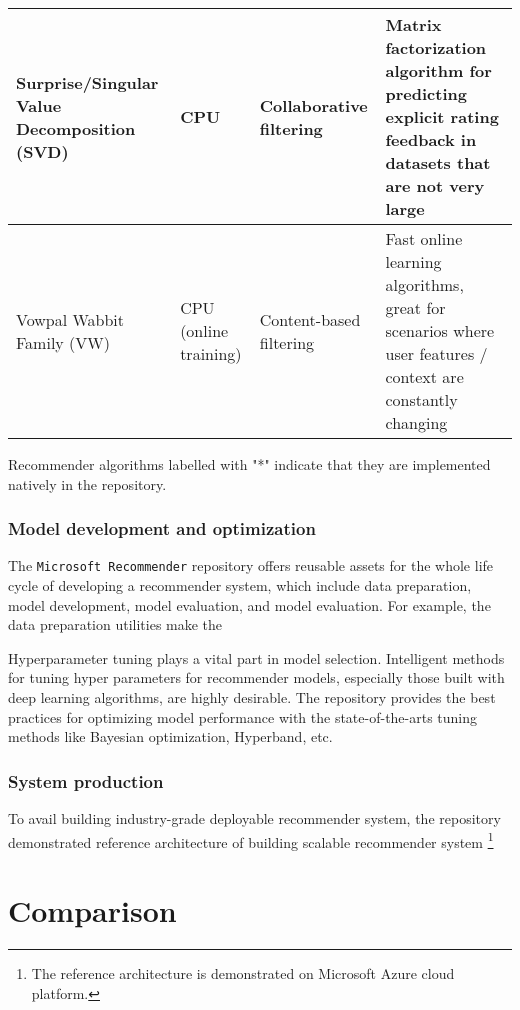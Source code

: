 \documentclass[twoside,11pt]{article}
\begin{document}
\begin{adjustbox}{angle=90}
\begin{threeparttable}
\begin{tabular}{|p{5cm}|p{3cm}|p{3cm}|p{5cm}|}
    Surprise/Singular Value Decomposition (SVD) & CPU & Collaborative filtering & Matrix factorization algorithm for predicting explicit rating feedback in datasets that are not very large \\
    \hline
    Vowpal Wabbit Family (VW) & CPU (online training) & Content-based filtering & Fast online learning algorithms, great for scenarios where user features / context are constantly changing \\
    \hline
    \end{tabular}
    \begin{tablenotes}
      \scriptsize
      \item Recommender algorithms labelled with "*" indicate that they are implemented natively in the repository.
    \end{tablenotes}
  \end{threeparttable}
\end{adjustbox}

\subsubsection{Model development and optimization}
The \verb|Microsoft Recommender| repository offers reusable assets for the whole life cycle of developing a recommender system, which include data preparation, model development, model evaluation, and model evaluation. For example, the data preparation utilities make the  

Hyperparameter tuning plays a vital part in model selection. Intelligent methods for tuning hyper parameters for recommender models, especially those built with deep learning algorithms, are highly desirable. The repository provides the best practices for optimizing model performance with the state-of-the-arts tuning methods like Bayesian optimization, Hyperband, etc.

\subsubsection{System production}
To avail building industry-grade deployable recommender system, the repository demonstrated reference architecture of building scalable recommender system \footnote{The reference architecture is demonstrated on Microsoft Azure cloud platform.}

\section{Comparison}
\end{document}
